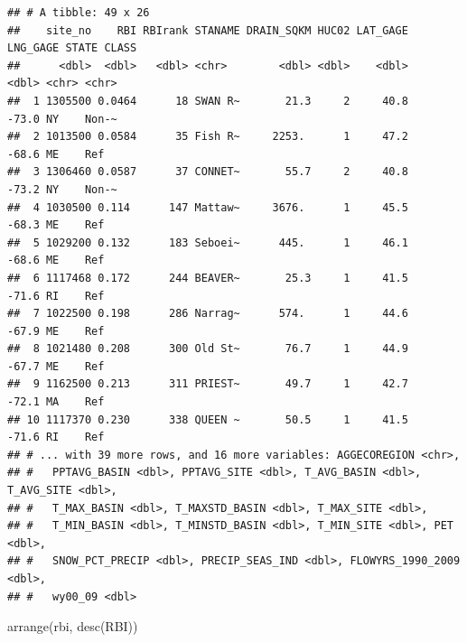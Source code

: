 \documentclass[
]{book}
\newenvironment{Shaded}{\begin{snugshade}}{\end{snugshade}}
\newcommand{\FunctionTok}[1]{\textcolor[rgb]{0.00,0.00,0.00}{#1}}
\newcommand{\NormalTok}[1]{#1}
\begin{document}
\begin{verbatim}
## # A tibble: 49 x 26
##    site_no    RBI RBIrank STANAME DRAIN_SQKM HUC02 LAT_GAGE LNG_GAGE STATE CLASS
##      <dbl>  <dbl>   <dbl> <chr>        <dbl> <dbl>    <dbl>    <dbl> <chr> <chr>
##  1 1305500 0.0464      18 SWAN R~       21.3     2     40.8    -73.0 NY    Non-~
##  2 1013500 0.0584      35 Fish R~     2253.      1     47.2    -68.6 ME    Ref  
##  3 1306460 0.0587      37 CONNET~       55.7     2     40.8    -73.2 NY    Non-~
##  4 1030500 0.114      147 Mattaw~     3676.      1     45.5    -68.3 ME    Ref  
##  5 1029200 0.132      183 Seboei~      445.      1     46.1    -68.6 ME    Ref  
##  6 1117468 0.172      244 BEAVER~       25.3     1     41.5    -71.6 RI    Ref  
##  7 1022500 0.198      286 Narrag~      574.      1     44.6    -67.9 ME    Ref  
##  8 1021480 0.208      300 Old St~       76.7     1     44.9    -67.7 ME    Ref  
##  9 1162500 0.213      311 PRIEST~       49.7     1     42.7    -72.1 MA    Ref  
## 10 1117370 0.230      338 QUEEN ~       50.5     1     41.5    -71.6 RI    Ref  
## # ... with 39 more rows, and 16 more variables: AGGECOREGION <chr>,
## #   PPTAVG_BASIN <dbl>, PPTAVG_SITE <dbl>, T_AVG_BASIN <dbl>, T_AVG_SITE <dbl>,
## #   T_MAX_BASIN <dbl>, T_MAXSTD_BASIN <dbl>, T_MAX_SITE <dbl>,
## #   T_MIN_BASIN <dbl>, T_MINSTD_BASIN <dbl>, T_MIN_SITE <dbl>, PET <dbl>,
## #   SNOW_PCT_PRECIP <dbl>, PRECIP_SEAS_IND <dbl>, FLOWYRS_1990_2009 <dbl>,
## #   wy00_09 <dbl>
\end{verbatim}

\begin{Shaded}
\begin{Highlighting}[]
\FunctionTok{arrange}\NormalTok{(rbi, }\FunctionTok{desc}\NormalTok{(RBI))}
\end{Highlighting}
\end{Shaded}
\end{document}
